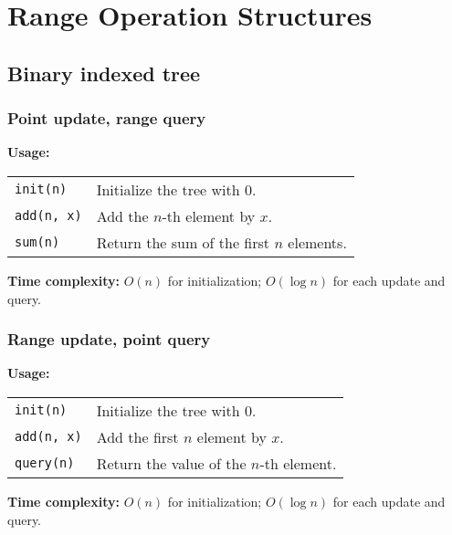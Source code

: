 
\newcommand{\BookNo}{3}
\newcommand{\BookTitle}{Data Structures}


\setmainfont{Times New Roman}
\setlength{\parskip}{0.0in}
\tableofcontents
\setlength{\parskip}{0.1in}
\newevenpage
\section{Range Operation Structures}
\subsection{Binary indexed tree}
\subsubsection{Point update, range query} \label{bit_purq}
\textbf{Usage:} \\[0.1cm]
\begin{tabular}{p{2cm} p{9.5cm}}
  \lstinline|init(n)| & Initialize the tree with 0. \\
  \lstinline|add(n, x)| & Add the $n$-th element by $x$. \\
  \lstinline|sum(n)| & Return the sum of the first $n$ elements.
\end{tabular} \par
\textbf{Time complexity:} $O(n)$ for initialization; $O(\log n)$ for each update and query. \par


\subsubsection{Range update, point query}
\textbf{Usage:} \\[0.1cm]
\begin{tabular}{p{2cm} p{9.5cm}}
  \lstinline|init(n)| & Initialize the tree with 0. \\
  \lstinline|add(n, x)| & Add the first $n$ element by $x$. \\
  \lstinline|query(n)| & Return the value of the $n$-th element.
\end{tabular} \par
\textbf{Time complexity:} $O(n)$ for initialization; $O(\log n)$ for each update and query. \par



